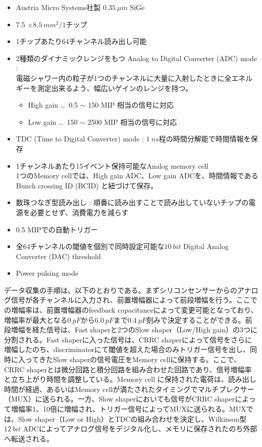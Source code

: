  \begin{itemize}
 	\item Austria Micro Systems社製 $\SI{0.35}{\mu m}$ SiGe
	\item 7.5 $\times \SI{8.5}{mm^2} /1チップ$
	\item 1チップあたり64チャンネル読み出し可能
	\item 2種類のダイナミックレンジをもつ Analog to Digital Converter (ADC) mode :\\
		電磁シャワー内の粒子が1つのチャンネルに大量に入射したときに全エネルギーを測定出来るよう、幅広いゲインのレンジを持つ。
		\begin{itemize}
			\item High gain \ldots \ 0.5 $\sim$ 150 MIP 相当の信号に対応
			\item Low gain \ldots \ 150 $\sim$ 2500 MIP 相当の信号に対応
		\end{itemize}
	\item TDC (Time to Digital Converter) mode : $\SI{1}{ns}$程の時間分解能で時間情報を保存
	\item 1チャンネルあたり15イベント保持可能なAnalog memory cell\\
		1つのMemory cellでは、High gain ADC、Low gain ADCを、時間情報であるBunch crossing ID (BCID) と紐づけて保存。
	\item 数珠つなぎ型読み出し : 順番に読み出すことで読み出していないチップの電源を必要とせず、消費電力を減らす
	\item 0.5 MIPでの自動トリガー
	\item 全64チャンネルの閾値を個別で同時設定可能な$\SI{10}{bit}$ Digital Analog Converter (DAC) threshold
	\item Power pulsing mode
 \end{itemize}
データ収集の手順は、以下のとおりである。まずシリコンセンサーからのアナログ信号が各チャンネルに入力され、前置増幅器によって前段増幅を行う。ここでの増幅率は、前置増幅器のfeedback capacitanceによって変更可能となっており、増幅率が最大となる$\SI{0}{pF}$から$\SI{6.0}{pF}$まで$\SI{0.4}{pF}$刻みで決定することができる。前段増幅を経た信号は、Fast shaperと2つのSlow shaper（Low/High gain）の3つに分割される。Fast shaperに入った信号は、CRRC shaperによって信号をさらに増幅したのち、discriminatorにて閾値を超えた場合のみトリガー信号を出し、同時に入ってきたSlow shaperの信号電圧をMemory cellに保持する。ここで、CRRC shaperとは微分回路と積分回路を組み合わせた回路であり、信号増幅率と立ち上がり時間を調整している。Memory cell に保持された電荷は、読み出し時間が経過、あるいはMemory cellが満たされたタイミングでマルチプレクサー（MUX）に送られる。一方、Slow shaperにおいても信号がCRRC shaperによって増幅率1、10倍に増幅され、トリガー信号によってMUXに送られる。MUXでは、Slow shaper（Low or High）とTDCの組み合わせを決定し、Wilkinson型$\SI{12}{bit}$ ADCによってアナログ信号をデジタル化し、メモリに保存されたのち外部へ転送される。
